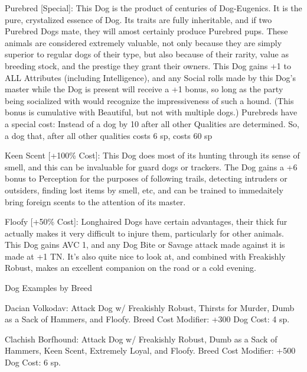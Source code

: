 \documentclass[oneside,11pt,english]{book}
\begin{document}
Purebred [Special]: This Dog is the product of centuries of Dog-Eugenics. It is the pure, crystalized 
essence of Dog. Its traits are fully inheritable, and if two Purebred Dogs mate, they will amost certainly 
produce Purebred pups. These animals are considered extremely valuable, not only because they are 
simply superior to regular dogs of their type, but also because of their rarity, value as breeding stock, and 
the prestige they grant their owners. 
This Dog gains +1 to ALL Attributes (including Intelligence), and any Social rolls made by this Dog’s 
master while the Dog is present will receive a +1 bonus, so long as the party being socialized with would 
recognize the impressiveness of such a hound. (This bonus is cumulative with Beautiful, but not with 
multiple dogs.) 
Purebreds have a special cost: Instead of a %
dog by 10 after all other Qualities are determined. So, a dog that, after all other qualities costs 6 sp, costs 
60 sp 

 

Keen Scent [+100\% Cost]: This Dog does most of its hunting through its sense of smell, and this can be 
invaluable for guard dogs or trackers. The Dog gains a +6 bonus to Perception for the purposes of 
following trails, detecting intruders or outsiders, finding lost items by smell, etc, and can be trained to 
immedaitely bring foreign scents to the attention of its master. 

 

Floofy [+50\% Cost]: Longhaired Dogs have certain advantages, their thick fur actually makes it very 
difficult to injure them, particularly for other animals. This Dog gains AVC 1, and any Dog Bite or 
Savage attack made against it is made at +1 TN. 
It’s also quite nice to look at, and combined with Freakishly Robust, makes an excellent companion on 
the road or a cold evening. 

 

Dog Examples by Breed 

 

Dacian Volkodav: Attack Dog w/ Freakishly Robust, Thirsts for Murder, Dumb as a Sack of Hammers, 
and Floofy. 
Breed Cost Modifier: +300%
Dog Cost: 4 sp. 

 


Clachish Borfhound: Attack Dog w/ Freakishly Robust, Dumb as a Sack of Hammers, Keen Scent, 
Extremely Loyal, and Floofy. 
Breed Cost Modifier: +500%
Dog Cost: 6 sp. 

 
\end{document}
